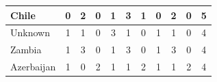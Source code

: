 \documentclass[12pt]{article}  %
\begin{document}
\begin{subappendices}
\begin{longtable}{|l|c|c|c|c|c|c|c|c|c|c|}
	\hline
	Chile                                                          & 0                                                                      & 2                                                                      & 0                                                                      & 1                                                                      & 3                                                                      & 1                                                                      & 0                         & 2                           & 0                           & 5                           \\ 
	\hline
	Unknown                                                        & 1                                                                      & 1                                                                      & 0                                                                      & 3                                                                      & 1                                                                      & 0                                                                      & 1                         & 1                           & 0                           & 4                           \\ 
	\hline
	Zambia                                                         & 1                                                                      & 3                                                                      & 0                                                                      & 1                                                                      & 3                                                                      & 0                                                                      & 1                         & 3                           & 0                           & 4                           \\ 
	\hline
	Azerbaijan                                                     & 1                                                                      & 0                                                                      & 2                                                                      & 1                                                                      & 1                                                                      & 2                                                                      & 1                         & 1                           & 2                           & 4                           \\ 

\end{longtable}
\end{subappendices}
\end{document}
